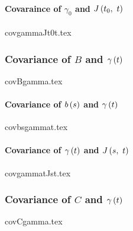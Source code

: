 \documentclass[letterpaper, 12pt]{article}
\begin{document}
				\paragraph{Covaraince of $\gamma_0$ and $J \left( t_0,\ t \right)$}
					{covgammaJt0t.tex}
			\subsubsection{Covariance of $B$ and $\gamma \left( t \right)$} \label{app:cov_B_gamma}
				{covBgamma.tex}
				\paragraph{Covariance of $b \left( s \right)$ and $\gamma \left( t \right)$}
					{covbsgammat.tex}
				\paragraph{Covariance of $\gamma \left( t \right)$ and $J \left( s,\ t \right)$}
					{covgammatJst.tex}
			\subsubsection{Covariance of $C$ and $\gamma \left( t \right)$} \label{app:cov_C_gamma}
				{covCgamma.tex}
\end{document}
